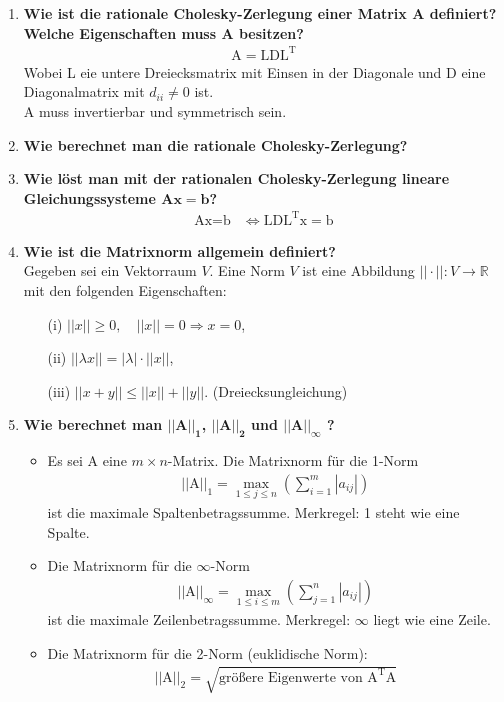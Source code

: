 \begin{enumerate}
		\item \textbf{Wie ist die rationale Cholesky-Zerlegung einer Matrix A definiert? Welche Eigenschaften muss A besitzen?}
			\begin{align*}
				\text{A}=\text{LDL}^\text{T}
			\end{align*}
			Wobei L eie untere Dreiecksmatrix mit Einsen in der Diagonale und D eine Diagonalmatrix mit \(d_{ii}\neq0\) ist.\\
			A muss invertierbar und symmetrisch sein.
		
		\item \textbf{Wie berechnet man die rationale Cholesky-Zerlegung?} \\
			
		
		\item \textbf{Wie löst man mit der rationalen Cholesky-Zerlegung lineare Gleichungssysteme \(\mathbf{Ax=b}\)?}
			\begin{align*}
				\text{Ax}=\text{b}&\Longleftrightarrow \text{LDL}^\text{T}\text{x}=\text{b}
			\end{align*}
		
		\item \textbf{Wie ist die Matrixnorm allgemein definiert?} \\
			Gegeben sei ein Vektorraum \(V\). Eine Norm \(V\) ist eine Abbildung \(||\cdot||:V\rightarrow\mathbb{R}\) mit den folgenden Eigenschaften:
			\begin{itemize}
				\item[(i)] \(||x||\geq 0,\quad ||x||=0\Rightarrow x=0\),
				\item[(ii)] \(||\lambda x||=|\lambda|\cdot||x||\),
				\item[(iii)] \(||x+y||\leq||x||+||y||\). (Dreiecksungleichung)
			\end{itemize}
		
		\item \textbf{Wie berechnet man \(\mathbf{||\text{A}||_1}\), \(\mathbf{||\text{A}||_2}\) und \(\mathbf{||\text{A}||_\infty}\) ?} \\
			\begin{itemize}
				\item Es sei A eine \(m\times n\)-Matrix.
					Die Matrixnorm für die 1-Norm
					\begin{align*}
						||\text{A}||_1=\underset{1\leq j\leq n}{\max}\left( \sum_{i=1}^{m}|a_{ij}|\right) 
					\end{align*}
					ist die maximale Spaltenbetragssumme. Merkregel: 1 steht wie eine Spalte.
				\item Die Matrixnorm für die \(\infty\)-Norm
					\begin{align*}
						||\text{A}||_\infty=\underset{1\leq i\leq m}{\max}\left( \sum_{j=1}^{n}|a_{ij}|\right)
					\end{align*}
					ist die maximale Zeilenbetragssumme. Merkregel: \(\infty\) liegt wie eine Zeile.
				\item Die Matrixnorm für die 2-Norm (euklidische Norm):
					\begin{align*}
						||\text{A}||_2=\sqrt{\text{größere Eigenwerte von A}^\text{T}\text{A}}
					\end{align*}
			\end{itemize}		
			

\end{enumerate}

